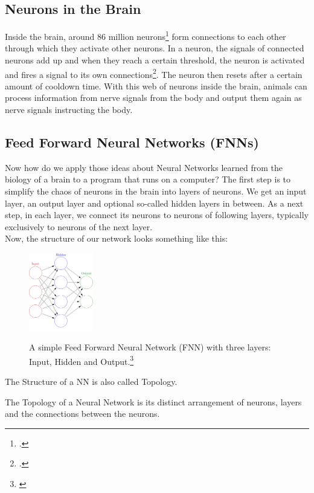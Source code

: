 \documentclass[11pt]{report}
\newcommand{\mydeflabel}{}
\newenvironment{mydef}[1]
 {\renewcommand\mydeflabel{#1}\begin{mydefinner}}
 {\end{mydefinner}}
\begin{document}
            \subsection{Neurons in the Brain}\label{subsec:neurons-in-the-brain}
    Inside the brain, around 86 million neurons\footcite{caruso_23} form connections to each other through which they activate other neurons.
    In a neuron, the signals of connected neurons add up and when they reach a certain threshold, the neuron is activated and fires a signal to its own connections\footcite{Newman_23}.
    The neuron then resets after a certain amount of cooldown time.
    With this web of neurons inside the brain, animals can process information from nerve signals from the body and output them again as nerve signals instructing the body.
            \subsection{Feed Forward Neural Networks (FNNs)}\label{subsec:feed-forward-neural-networks-(fnns)}
    Now how do we apply those ideas about Neural Networks learned from the biology of a brain to a program that runs on a computer?
    The first step is to simplify the chaos of neurons in the brain into layers of neurons.
    We get an input layer, an output layer and optional so-called hidden layers in between.
    As a next step, in each layer, we connect its neurons to neurons of following layers, typically exclusively to neurons of the next layer.
    \\
    Now, the structure of our network looks something like this:
    \begin{figure}[H]
        \centering
        \includegraphics[width=0.25\textwidth]{nn_simple_1}~\caption{A simple Feed Forward Neural Network (FNN) with three layers: Input, Hidden and Output.\footnote{\cite{nn_simple_img_1}}}
        \label{fig:nn_simple_1}
    \end{figure}
    \noindent
    The Structure of a NN is also called Topology.
    \begin{mydef}{Neural Network Topology}
        The Topology of a Neural Network is its distinct arrangement of neurons, layers and the connections between the neurons.
        \label{definition:Topology}
    \end{mydef}
\end{document}
